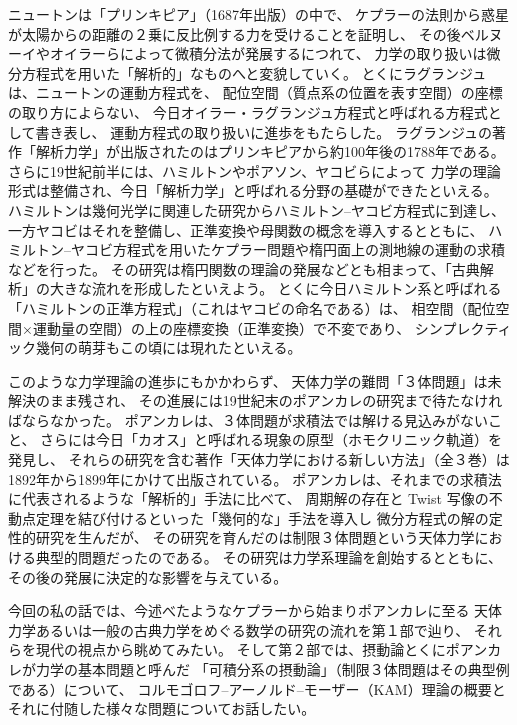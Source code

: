 \documentclass[uplatex,dvipdfmx]{jlreq}
\begin{document}
ニュートンは「プリンキピア」（1687年出版）の中で、
ケプラーの法則から惑星が太陽からの距離の２乗に反比例する力を受けることを証明し、
その後ベルヌーイやオイラーらによって微積分法が発展するにつれて、
力学の取り扱いは微分方程式を用いた「解析的」なものへと変貌していく。
とくにラグランジュは、ニュートンの運動方程式を、
配位空間（質点系の位置を表す空間）の座標の取り方によらない、
今日オイラー・ラグランジュ方程式と呼ばれる方程式として書き表し、
運動方程式の取り扱いに進歩をもたらした。
ラグランジュの著作「解析力学」が出版されたのはプリンキピアから約100年後の1788年である。
さらに19世紀前半には、ハミルトンやポアソン、ヤコビらによって
力学の理論形式は整備され、今日「解析力学」と呼ばれる分野の基礎ができたといえる。
ハミルトンは幾何光学に関連した研究からハミルトン--ヤコビ方程式に到達し、
一方ヤコビはそれを整備し、正準変換や母関数の概念を導入するとともに、
ハミルトン--ヤコビ方程式を用いたケプラー問題や楕円面上の測地線の運動の求積などを行った。
その研究は楕円関数の理論の発展などとも相まって、「古典解析」の大きな流れを形成したといえよう。
とくに今日ハミルトン系と呼ばれる「ハミルトンの正準方程式」（これはヤコビの命名である）は、
相空間（配位空間×運動量の空間）の上の座標変換（正準変換）で不変であり、
シンプレクティック幾何の萌芽もこの頃には現れたといえる。

このような力学理論の進歩にもかかわらず、
天体力学の難問「３体問題」は未解決のまま残され、
その進展には19世紀末のポアンカレの研究まで待たなければならなかった。
ポアンカレは、３体問題が求積法では解ける見込みがないこと、
さらには今日「カオス」と呼ばれる現象の原型（ホモクリニック軌道）を発見し、
それらの研究を含む著作「天体力学における新しい方法」（全３巻）は
1892年から1899年にかけて出版されている。
ポアンカレは、それまでの求積法に代表されるような「解析的」手法に比べて、
周期解の存在と Twist 写像の不動点定理を結び付けるといった「幾何的な」手法を導入し
微分方程式の解の定性的研究を生んだが、
その研究を育んだのは制限３体問題という天体力学における典型的問題だったのである。
その研究は力学系理論を創始するとともに、その後の発展に決定的な影響を与えている。

今回の私の話では、今述べたようなケプラーから始まりポアンカレに至る
天体力学あるいは一般の古典力学をめぐる数学の研究の流れを第１部で辿り、
それらを現代の視点から眺めてみたい。
そして第２部では、摂動論とくにポアンカレが力学の基本問題と呼んだ
「可積分系の摂動論」（制限３体問題はその典型例である）について、
コルモゴロフ--アーノルド--モーザー（KAM）理論の概要と
それに付随した様々な問題についてお話したい。

\bigskip

\end{document}
